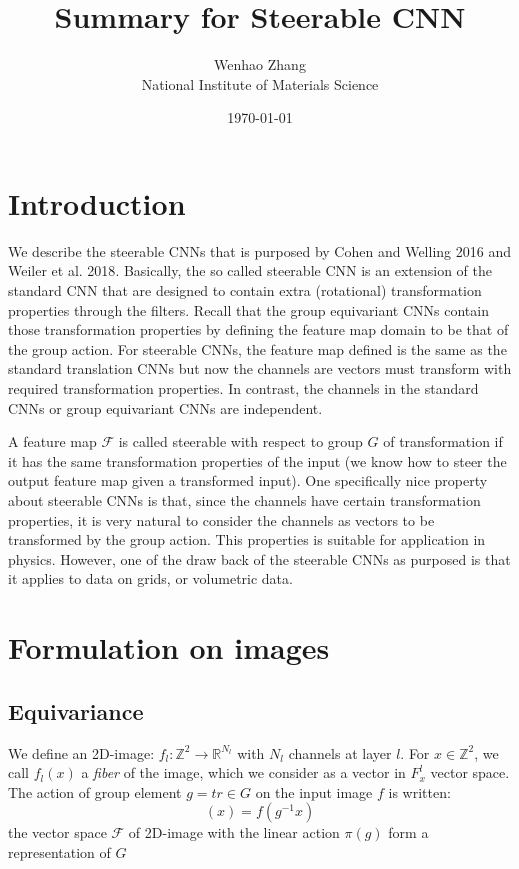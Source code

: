 \documentclass{article}
\newcommand{\bbz}{\mathbb{Z}}
\newcommand{\bbr}{\mathbb{R}}
\newcommand{\calf}{\mathcal{F}}
\begin{document}
\title{Summary for Steerable CNN}
\author{Wenhao Zhang\\National Institute of Materials Science}
\date{\today}
\maketitle

\section{Introduction}
We describe the steerable CNNs that is purposed by Cohen and Welling 2016\cite{CW2016} and Weiler et al. 2018\cite{W2018_3D, W2018_Learning}. 
Basically, the so called steerable CNN is an extension of the standard CNN that are designed to contain extra (rotational) transformation properties through the filters.
Recall that the group equivariant CNNs contain those transformation properties by defining the feature map domain to be that of the group action. 
For steerable CNNs, the feature map defined is the same as the standard translation CNNs but now the channels are vectors must 
transform with required transformation properties. 
In contrast, the channels in the standard CNNs or group equivariant CNNs are independent.

A feature map $\calf$ is called steerable with respect to group $G$ of transformation if it has the same transformation properties of the input
(we know how to steer the output feature map given a transformed input).
One specifically nice property about steerable CNNs is that, since the channels have certain transformation properties, it is very natural 
to consider the channels as vectors to be transformed by the group action. This properties is suitable for application in physics. 
However, one of the draw back of the steerable CNNs as purposed is that it applies to data on grids, or volumetric data.

\section{Formulation on images}
\subsection*{Equivariance}
We define an 2D-image: $f_l\colon \bbz^2 \to \bbr^{N_l}$ with $N_l$ channels at layer $l$. For $x\in \bbz^2$, we call $f_l(x)$ a \emph{fiber}
of the image, which we consider as a vector in $F_x^l$ vector space. 
The action of group element $g=tr \in G$ on the input image $f$ is written:
\begin{equation}
    [\pi(g) f](x) = f(g^{-1}x)
    \label{E:representation_on_input}
\end{equation}
the vector space $\calf$ of 2D-image with the linear action $\pi(g)$ form a representation of $G$
\end{document}
